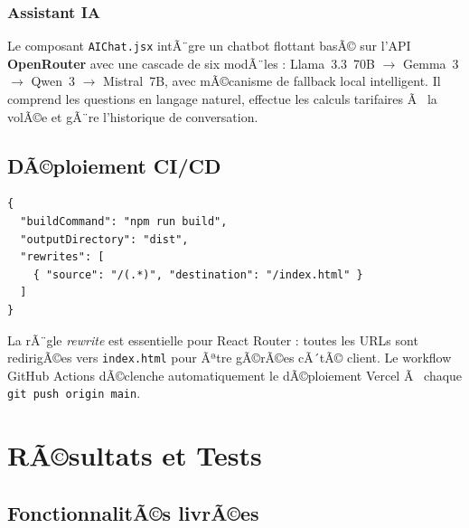 \documentclass[12pt,a4paper]{report}
\begin{document}
\subsection{Assistant IA}

Le composant \texttt{AIChat.jsx} intÃ¨gre un chatbot flottant basÃ© sur l'API \textbf{OpenRouter} avec une cascade de six modÃ¨les : Llama~3.3~70B $\rightarrow$ Gemma~3 $\rightarrow$ Qwen~3 $\rightarrow$ Mistral~7B, avec mÃ©canisme de fallback local intelligent. Il comprend les questions en langage naturel, effectue les calculs tarifaires Ã  la volÃ©e et gÃ¨re l'historique de conversation.

\section{DÃ©ploiement CI/CD}

\begin{lstlisting}[language={},caption={vercel.json â€” Configuration de dÃ©ploiement SPA}]
{
  "buildCommand": "npm run build",
  "outputDirectory": "dist",
  "rewrites": [
    { "source": "/(.*)", "destination": "/index.html" }
  ]
}
\end{lstlisting}

La rÃ¨gle \textit{rewrite} est essentielle pour React Router : toutes les URLs sont redirigÃ©es vers \texttt{index.html} pour Ãªtre gÃ©rÃ©es cÃ´tÃ© client. Le workflow GitHub Actions dÃ©clenche automatiquement le dÃ©ploiement Vercel Ã  chaque \texttt{git push origin main}.

\chapter{RÃ©sultats et Tests}
\label{ch:resultats}

\section{FonctionnalitÃ©s livrÃ©es}
\end{document}
